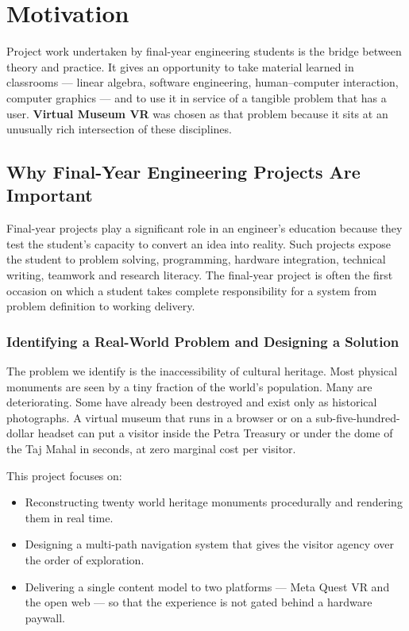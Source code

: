 \chapter{Motivation}

Project work undertaken by final-year engineering students is the bridge between theory and practice. It gives an opportunity to take material learned in classrooms --- linear algebra, software engineering, human--computer interaction, computer graphics --- and to use it in service of a tangible problem that has a user. \textbf{Virtual Museum VR} was chosen as that problem because it sits at an unusually rich intersection of these disciplines.

\section{Why Final-Year Engineering Projects Are Important}

Final-year projects play a significant role in an engineer's education because they test the student's capacity to convert an idea into reality. Such projects expose the student to problem solving, programming, hardware integration, technical writing, teamwork and research literacy. The final-year project is often the first occasion on which a student takes complete responsibility for a system from problem definition to working delivery.

\subsection{Identifying a Real-World Problem and Designing a Solution}

The problem we identify is the inaccessibility of cultural heritage. Most physical monuments are seen by a tiny fraction of the world's population. Many are deteriorating. Some have already been destroyed and exist only as historical photographs. A virtual museum that runs in a browser or on a sub-five-hundred-dollar headset can put a visitor inside the Petra Treasury or under the dome of the Taj Mahal in seconds, at zero marginal cost per visitor.

This project focuses on:

\begin{itemize}
\item Reconstructing twenty world heritage monuments procedurally and rendering them in real time.
\item Designing a multi-path navigation system that gives the visitor agency over the order of exploration.
\item Delivering a single content model to two platforms --- Meta Quest VR and the open web --- so that the experience is not gated behind a hardware paywall.
\end{itemize}

